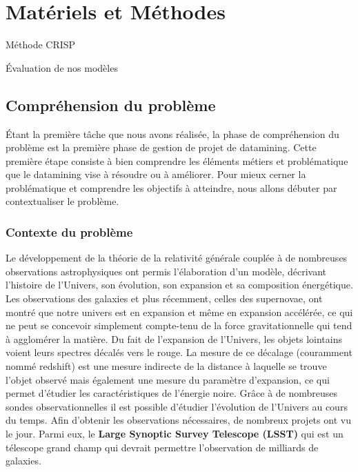 \chapter{Matériels et Méthodes}

Méthode CRISP\cite{crisp}

Évaluation de nos modèles \cite{plasticc_team_2019_2539456}

\section{Compréhension du problème}
Étant la première tâche que nous avons réalisée, la phase de compréhension du problème est la première phase de gestion de projet de datamining. Cette première étape consiste à bien comprendre les éléments métiers et problématique que le datamining vise à résoudre ou à améliorer.
Pour mieux cerner la problématique et comprendre les objectifs à atteindre, nous allons débuter par contextualiser le problème.
\subsection{Contexte du problème}
Le développement de la théorie de la relativité générale couplée à de nombreuses observations astrophysiques ont permis l'élaboration d'un modèle, décrivant l'histoire de l'Univers, son évolution, son expansion et sa composition énergétique.
Les observations des galaxies et plus récemment, celles des supernovae, ont montré que notre univers est en expansion et même en expansion accélérée, ce qui ne peut se concevoir simplement compte-tenu de la force gravitationnelle qui tend à agglomérer la matière.
Du fait de l'expansion de l'Univers, les objets lointains voient leurs spectres décalés vers le rouge. La mesure de ce décalage (couramment nommé redshift) est une mesure indirecte de la distance à laquelle se trouve l'objet observé mais également une mesure du paramètre d'expansion, ce qui permet d'étudier les caractéristiques de l'énergie noire. Grâce à de nombreuses sondes observationnelles il est possible d'étudier l'évolution de l'Univers au cours du temps.
Afin d'obtenir les observations nécessaires, de nombreux projets ont vu le jour. Parmi eux, le \textbf{Large Synoptic Survey Telescope (LSST)} qui est un télescope grand champ qui devrait permettre l'observation de milliards de galaxies.
